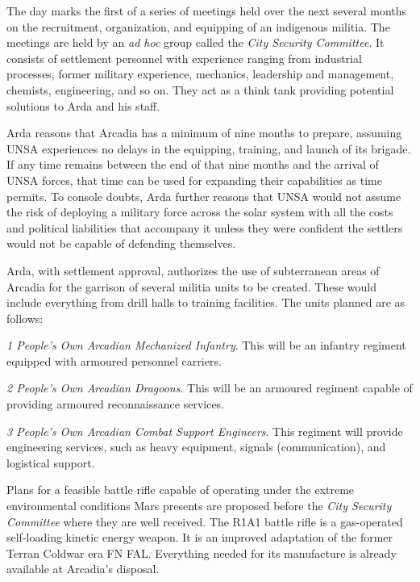 The day marks the first of a series of meetings held over the next several months on the recruitment, organization, and equipping of an indigenous militia. The meetings are held by an {\it ad hoc} group called the {\it City Security Committee}. It consists of settlement personnel with experience ranging from industrial processes, former military experience, mechanics, leadership and management, chemists, engineering, and so on. They act as a think tank providing potential solutions to Arda and his staff.

Arda reasons that Arcadia has a minimum of nine months to prepare, assuming UNSA experiences no delays in the equipping, training, and launch of its brigade. If any time remains between the end of that nine months and the arrival of UNSA forces, that time can be used for expanding their capabilities as time permits. To console doubts, Arda further reasons that UNSA would not assume the risk of deploying a military force across the solar system with all the costs and political liabilities that accompany it unless they were confident the settlers would not be capable of defending themselves.
\StopTimelineDate

Arda, with settlement approval, authorizes the use of subterranean areas of Arcadia for the garrison of several militia units to be created. These would include everything from drill halls to training facilities. The units planned are as follows:

\startitemize[4]
\item {\it 1 People's Own Arcadian Mechanized Infantry}. This will be an infantry regiment equipped with armoured personnel carriers.

\item {\it 2 People's Own Arcadian Dragoons}. This will be an armoured regiment capable of providing armoured reconnaissance services.

\item {\it 3 People's Own Arcadian Combat Support Engineers}. This regiment will provide engineering services, such as heavy equipment, signals (communication), and logistical support.
\stopitemize
\StopTimelineDate

Plans for a feasible battle rifle capable of operating under the extreme environmental conditions Mars presents are proposed before the {\it City Security Committee} where they are well received. The R1A1 battle rifle is a gas-operated self-loading kinetic energy weapon. It is an improved adaptation of the former Terran Coldwar era FN FAL. Everything needed for its manufacture is already available at Arcadia's disposal.

